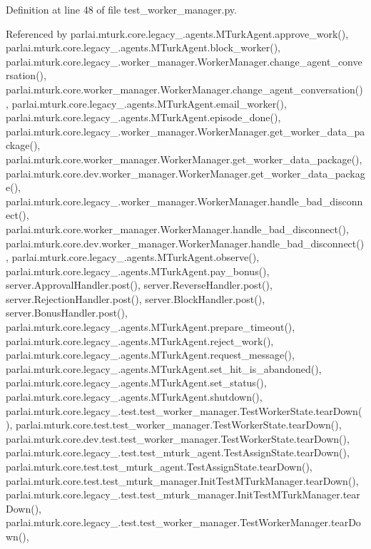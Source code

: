 Definition at line 48 of file test\+\_\+worker\+\_\+manager.\+py.



Referenced by parlai.\+mturk.\+core.\+legacy\+\_.\+agents.\+M\+Turk\+Agent.\+approve\+\_\+work(), parlai.\+mturk.\+core.\+legacy\+\_.\+agents.\+M\+Turk\+Agent.\+block\+\_\+worker(), parlai.\+mturk.\+core.\+legacy\+\_.\+worker\+\_\+manager.\+Worker\+Manager.\+change\+\_\+agent\+\_\+conversation(), parlai.\+mturk.\+core.\+worker\+\_\+manager.\+Worker\+Manager.\+change\+\_\+agent\+\_\+conversation(), parlai.\+mturk.\+core.\+legacy\+\_.\+agents.\+M\+Turk\+Agent.\+email\+\_\+worker(), parlai.\+mturk.\+core.\+legacy\+\_.\+agents.\+M\+Turk\+Agent.\+episode\+\_\+done(), parlai.\+mturk.\+core.\+legacy\+\_.\+worker\+\_\+manager.\+Worker\+Manager.\+get\+\_\+worker\+\_\+data\+\_\+package(), parlai.\+mturk.\+core.\+worker\+\_\+manager.\+Worker\+Manager.\+get\+\_\+worker\+\_\+data\+\_\+package(), parlai.\+mturk.\+core.\+dev.\+worker\+\_\+manager.\+Worker\+Manager.\+get\+\_\+worker\+\_\+data\+\_\+package(), parlai.\+mturk.\+core.\+legacy\+\_.\+worker\+\_\+manager.\+Worker\+Manager.\+handle\+\_\+bad\+\_\+disconnect(), parlai.\+mturk.\+core.\+worker\+\_\+manager.\+Worker\+Manager.\+handle\+\_\+bad\+\_\+disconnect(), parlai.\+mturk.\+core.\+dev.\+worker\+\_\+manager.\+Worker\+Manager.\+handle\+\_\+bad\+\_\+disconnect(), parlai.\+mturk.\+core.\+legacy\+\_.\+agents.\+M\+Turk\+Agent.\+observe(), parlai.\+mturk.\+core.\+legacy\+\_.\+agents.\+M\+Turk\+Agent.\+pay\+\_\+bonus(), server.\+Approval\+Handler.\+post(), server.\+Reverse\+Handler.\+post(), server.\+Rejection\+Handler.\+post(), server.\+Block\+Handler.\+post(), server.\+Bonus\+Handler.\+post(), parlai.\+mturk.\+core.\+legacy\+\_.\+agents.\+M\+Turk\+Agent.\+prepare\+\_\+timeout(), parlai.\+mturk.\+core.\+legacy\+\_.\+agents.\+M\+Turk\+Agent.\+reject\+\_\+work(), parlai.\+mturk.\+core.\+legacy\+\_.\+agents.\+M\+Turk\+Agent.\+request\+\_\+message(), parlai.\+mturk.\+core.\+legacy\+\_.\+agents.\+M\+Turk\+Agent.\+set\+\_\+hit\+\_\+is\+\_\+abandoned(), parlai.\+mturk.\+core.\+legacy\+\_.\+agents.\+M\+Turk\+Agent.\+set\+\_\+status(), parlai.\+mturk.\+core.\+legacy\+\_.\+agents.\+M\+Turk\+Agent.\+shutdown(), parlai.\+mturk.\+core.\+legacy\+\_.\+test.\+test\+\_\+worker\+\_\+manager.\+Test\+Worker\+State.\+tear\+Down(), parlai.\+mturk.\+core.\+test.\+test\+\_\+worker\+\_\+manager.\+Test\+Worker\+State.\+tear\+Down(), parlai.\+mturk.\+core.\+dev.\+test.\+test\+\_\+worker\+\_\+manager.\+Test\+Worker\+State.\+tear\+Down(), parlai.\+mturk.\+core.\+legacy\+\_.\+test.\+test\+\_\+mturk\+\_\+agent.\+Test\+Assign\+State.\+tear\+Down(), parlai.\+mturk.\+core.\+test.\+test\+\_\+mturk\+\_\+agent.\+Test\+Assign\+State.\+tear\+Down(), parlai.\+mturk.\+core.\+test.\+test\+\_\+mturk\+\_\+manager.\+Init\+Test\+M\+Turk\+Manager.\+tear\+Down(), parlai.\+mturk.\+core.\+legacy\+\_.\+test.\+test\+\_\+mturk\+\_\+manager.\+Init\+Test\+M\+Turk\+Manager.\+tear\+Down(), parlai.\+mturk.\+core.\+legacy\+\_.\+test.\+test\+\_\+worker\+\_\+manager.\+Test\+Worker\+Manager.\+tear\+Down(), 